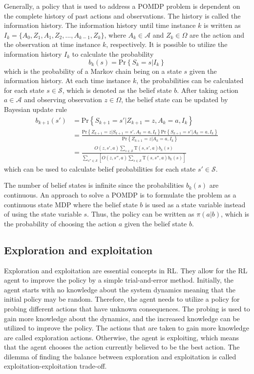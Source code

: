 \documentclass[english, 12pt, a4paper, elec, utf8, a-1b, online]{aaltothesis}
\newcommand{\Ss}{\mathcal{S}}
\newcommand{\As}{\mathcal{A}}
\newcommand{\Os}{\Omega}
\newcommand{\Op}{O}
\renewcommand{\Pr}[1]{\text{Pr}\left\{ #1 \right\}}
\begin{document}
Generally, a policy that is used to address a POMDP problem is dependent on the complete history of past actions and observations. 
The history is called the information history.
The information history until time instance $k$ is written as $I_k=\{A_0, Z_1, A_1, Z_2, ..., A_{k-1}, Z_{k}\}$, where $A_k \in \As$ and $Z_k \in \Os$ are the action and the observation at time instance $k$, respectively.
It is possible to utilize the information history $I_k$ to calculate the probability
\begin{equation}
    b_k(s) = \Pr{S_k=s|I_k}
\end{equation}
which is the probability of a Markov chain being on a state $s$ given the information history.
At each time instance $k$, the probabilities can be calculated for each state $s \in \Ss$, which is denoted as the belief state $b$.
After taking action $a \in \As$ and observing observation $z \in \Os$, the belief state can be updated by Bayesian update rule \cite{Krishnamurthy2016}
\begin{align}
    b_{k+1}(s') 
    &= \Pr{S_{k+1}=s' | Z_{k+1}=z, A_k=a, I_k} \\
    &= \frac
        {\Pr{Z_{k+1}=z | S_{k+1}=s' , A_k=a, I_k} \Pr{S_{k+1}=s'| A_k=a, I_k}}
        {\Pr{Z_{k+1}=z | A_k=a, I_k}} \\
    &= \frac
        {\Op(z, s', a) \sum_{s \in \Ss} \mathrm{T}(s, s', a) b_k(s)}
        {\sum_{s''  \in \Ss} \left[ 
            \Op(z, s'', a) \sum_{s \in \Ss} \mathrm{T}(s, s'', a) b_k(s) \right]}  \label{eq:belief_state_update}
\end{align}
which can be used to calculate belief probabilities for each state $s' \in \Ss$.

The number of belief states is infinite since the probabilities $b_k(s)$ are continuous.
An approach to solve a POMDP is to formulate the problem as a continuous state MDP where the belief state $b$ is used as a state variable instead of using the state variable $s$.
Thus, the policy can be written as $\pi(a | b)$, which is the probability of choosing the action $a$ given the belief state $b$.

\subsection{Exploration and exploitation}\label{sec:exp_exp}

Exploration and exploitation are essential concepts in RL. 
They allow for the RL agent to improve the policy by a simple trial-and-error method.
Initially, the agent starts with no knowledge about the system dynamics meaning that the initial policy may be random.
Therefore, the agent needs to utilize a policy for probing different actions that have unknown consequences.
The probing is used to gain more knowledge about the dynamics, and the increased knowledge can be utilized to improve the policy.
The actions that are taken to gain more knowledge are called exploration actions.
Otherwise, the agent is exploiting, which means that the agent chooses the action currently believed to be the best action.
The dilemma of finding the balance between exploration and exploitation is called exploitation-exploitation trade-off.
\end{document}
